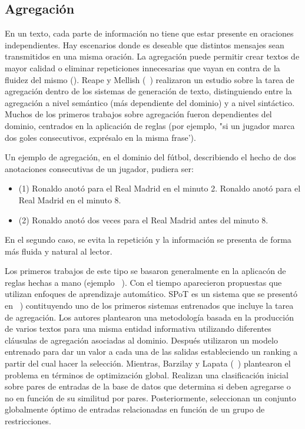 \subsection{Agregación}\label{subsection:agregacion}

    En un texto, cada parte de información no tiene que estar presente en oraciones independientes. Hay escenarios donde es 
deseable que distintos mensajes sean transmitidos en una misma oraci\'on. La agregaci\'on puede permitir crear textos de mayor 
calidad o eliminar repeticiones innecesarias que vayan en contra de la fluidez del mismo (\cite{Gatt2018SurveyOT}). Reape y Mellish (~\cite{reape1999just})
realizaron un estudio sobre la tarea de agregación dentro de los sistemas de generación de texto, distinguiendo entre la agregación a nivel semántico (más dependiente del dominio)
y a nivel sintáctico. Muchos de los primeros trabajos sobre agregación fueron dependientes del dominio, centrados en la aplicación de reglas (por ejemplo, 
"si un jugador marca dos goles consecutivos, expr\'esalo en la misma frase'). 

    Un ejemplo de agregaci\'on, en el dominio del f\'utbol, describiendo el hecho de dos anotaciones consecutivas de un jugador, pudiera ser:

\begin{itemize}
    \item (1) Ronaldo anot\'o para el Real Madrid en el minuto 2. Ronaldo anot\'o para el Real Madrid en el minuto 8.
    \item (2) Ronaldo anot\'o dos veces para el Real Madrid antes del minuto 8.
\end{itemize}

    En el segundo caso, se evita la repetici\'on y la información se presenta de forma m\'as fluida y natural al lector.
    
Los primeros trabajos de este tipo se basaron generalmente en la aplicacón de reglas hechas a mano (ejemplo ~\cite{Shaw1998ClauseAU}). Con el tiempo aparecieron propuestas que 
utilizan enfoques de aprendizaje autom\'atico. SPoT es un sistema que se present\'o en ~\cite{walker2001spot}) 
contituyendo uno de los primeros sistemas entrenados que incluye la tarea de agregación. Los autores plantearon una metodolog\'ia basada en la producci\'on 
de varios textos para una misma entidad informativa utilizando diferentes cl\'ausulas de agregación asociadas al dominio. Despu\'es utilizaron un modelo 
entrenado para dar un valor a cada una de las salidas estableciendo un ranking a partir del cual hacer la selección. Mientras, Barzilay y Lapata (~\cite{Barzilay2006AggregationVS})
plantearon el problema en términos de optimización global. Realizan una clasificación inicial sobre pares de entradas de la base de datos que determina 
si deben agregarse o no en función de su similitud por pares. Posteriormente, seleccionan un conjunto globalmente óptimo de entradas relacionadas en función
de un grupo de restricciones.

